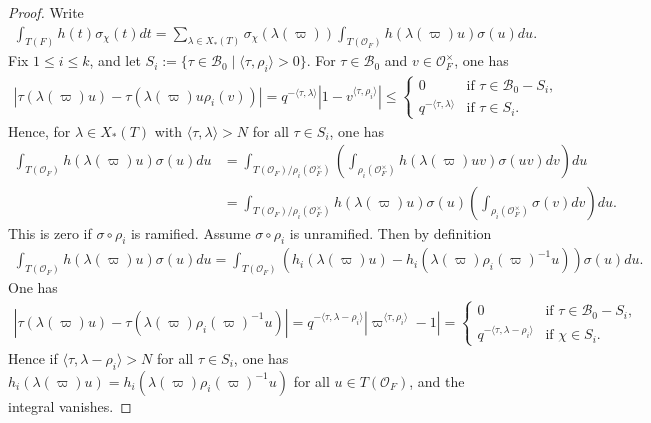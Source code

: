 \documentclass[10pt]{amsart}
\theoremstyle{definition}
\numberwithin{equation}{section}
\numberwithin{equation}{subsection}
\begin{document}
\begin{proof}
Write
\begin{align*}
    \int_{T(F)} h(t)\sigma_\chi(t)dt = \sum_{\lambda\in X_*(T)} \sigma_\chi(\lambda(\varpi)) \int_{T(\mathcal{O}_F)} h(\lambda(\varpi)u) \sigma(u)du.
\end{align*}
Fix $1\le i\le k$, and let $S_i := \{\tau\in\mathcal{B}_0\mid \langle\tau,\rho_i\rangle>0\}$. For $\tau\in \mathcal{B}_0$ and $v\in \mathcal{O}_F^\times$, one has
\begin{align*}
    |\tau(\lambda(\varpi)u) - \tau(\lambda(\varpi) u \rho_i(v))|= q^{-\langle \tau,\lambda\rangle} |1-v^{\langle\tau,\rho_i\rangle}| \le \left\{\begin{array}{ll}
        0 &\textrm{if }\tau\in\mathcal{B}_0-S_i,  \\
        q^{-\langle\tau,\lambda\rangle} &\textrm{if }\tau\in S_i.
    \end{array}\right.
\end{align*}
Hence, for $\lambda\in X_*(T)$ with $\langle\tau,\lambda\rangle>N$ for all $\tau\in S_i$, one has
\begin{align*}
    \int_{T(\mathcal{O}_F)} h(\lambda(\varpi)u) \sigma(u)du &= \int_{T(\mathcal{O}_F)/\rho_i(\mathcal{O}_F^\times)}\left(\int_{\rho_i(\mathcal{O}_F^\times)} h(\lambda(\varpi)uv) \sigma(uv) dv\right)du\\
    &=\int_{T(\mathcal{O}_F)/\rho_i(\mathcal{O}_F^\times)} h(\lambda(\varpi)u)\sigma(u)\left(\int_{\rho_i(\mathcal{O}_F^\times)}\sigma(v) dv\right)du.
\end{align*}
This is zero if $\sigma\circ\rho_i$ is ramified. Assume $\sigma\circ\rho_i$ is unramified. Then by definition
\begin{align*}
    \int_{T(\mathcal{O}_F)} h(\lambda(\varpi)u) \sigma(u)du = \int_{T(\mathcal{O}_F)} \left(h_i(\lambda(\varpi)u)-h_i(\lambda(\varpi)\rho_i(\varpi)^{-1}u)\right)\sigma(u)du.
\end{align*}
One has 
\begin{align*}
    |\tau(\lambda(\varpi)u) - \tau(\lambda(\varpi)\rho_i(\varpi)^{-1}u)| = q^{-\langle\tau,\lambda-\rho_i\rangle} |\varpi^{\langle\tau,\rho_i\rangle} - 1| = \left\{\begin{array}{ll}
        0 &\text{if }\tau\in\mathcal{B}_0-S_i,  \\
        q^{-\langle\tau,\lambda-\rho_i\rangle} &\text{if }\chi\in S_i.
    \end{array}\right.
\end{align*}
Hence if $\langle\tau,\lambda-\rho_i\rangle>N$ for all $\tau\in S_i$, one has $h_i(\lambda(\varpi)u) = h_i(\lambda(\varpi)\rho_i(\varpi)^{-1}u)$ for all $u\in T(\mathcal{O}_F)$, and the integral vanishes.


\end{proof}
\end{document}
